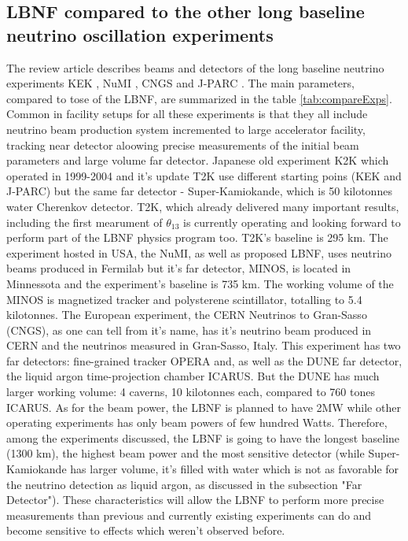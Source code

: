 \subsection{LBNF compared to the other long baseline neutrino oscillation experiments}
The review article \cite{ref_LBN_OscExpReview} describes beams and detectors of the long baseline neutrino experiments KEK \cite{ref_KEK}, NuMI \cite{ref_NuMI}, CNGS \cite{ref_CNGS} and J-PARC \cite{ref_JPARC}. The main parameters, compared to tose of the LBNF, are summarized in the table \ref{tab:compareExps}. Common in facility setups for all these experiments is that they all include neutrino beam production system incremented to large accelerator facility, tracking near detector aloowing precise measurements of the initial beam parameters and large volume far detector. Japanese old experiment K2K which operated in 1999-2004 and it's update T2K use different starting poins (KEK and J-PARC) but the same far detector - Super-Kamiokande, which is 50 kilotonnes water Cherenkov detector. T2K, which already delivered many important results, including the first mearument of $\theta_{13}$ is currently operating and looking forward to perform part of the LBNF physics program too. T2K's baseline is 295 km. The experiment hosted in USA, the NuMI, as well as proposed LBNF, uses neutrino beams produced in Fermilab but it's far detector, MINOS, is located in Minnessota and the experiment's baseline is 735 km. The working volume of the MINOS is magnetized tracker and polysterene scintillator, totalling to 5.4 kilotonnes. The European experiment, the CERN Neutrinos to Gran-Sasso (CNGS), as one can tell from it's name, has it's neutrino beam produced in CERN and the neutrinos measured in Gran-Sasso, Italy. This experiment has two far detectors: fine-grained tracker OPERA and, as well as the DUNE far detector, the liquid argon time-projection chamber ICARUS. But the DUNE has much larger working volume: 4 caverns, 10 kilotonnes each, compared to 760 tones ICARUS. As for the beam power, the LBNF is planned to have 2MW while other operating experiments has only beam powers of few hundred Watts. Therefore, among the experiments discussed, the LBNF is going to have the longest baseline (1300 km), the highest beam power and the most sensitive detector (while Super-Kamiokande has larger volume, it's filled with water which is not as favorable for the neutrino detection as liquid argon, as discussed in the subsection "Far Detector"). These characteristics will allow the LBNF to perform more precise measurements than previous and currently existing experiments can do and become sensitive to effects which weren't observed before.

